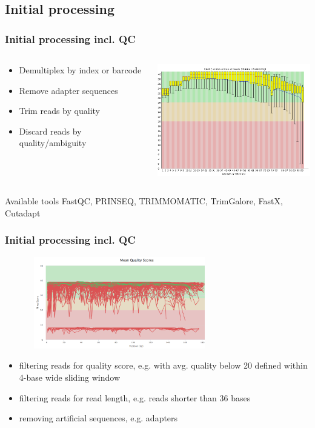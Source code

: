 \documentclass{beamer}\usepackage[]{graphicx}\usepackage[]{color}
\begin{document}
\subsection{Initial processing}
\begin{frame}
\frametitle{Initial processing incl. QC}
\footnotesize
\begin{columns}
\begin{column}{0.38\textwidth}
\begin{itemize}
\item Demultiplex by index or barcode
\item Remove adapter sequences
\item Trim reads by quality
\item Discard reads by quality/ambiguity
\end{itemize}
\end{column}
\begin{column}{0.58\textwidth}
\includegraphics[width=7cm]{Images/fastq_qc_good.png}
\end{column}
\end{columns}
\vspace{5mm}
\begin{block}{Available tools}
FastQC, PRINSEQ, TRIMMOMATIC, TrimGalore, FastX, Cutadapt
\end{block}
\end{frame}

\begin{frame}
\frametitle{Initial processing incl. QC}
\centering
\includegraphics[width=10cm, height=4cm]{Images/fastq_qc_poor.png}
\begin{itemize}
\footnotesize
\item filtering reads for quality score, e.g. with avg. quality below 20 defined within 4-base wide sliding window
\item filtering reads for read length, e.g. reads shorter than 36 bases
\item removing artificial sequences, e.g. adapters
\end{itemize}
\end{frame}
\end{document}
